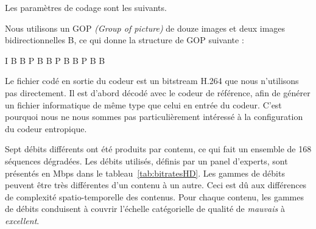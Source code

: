 Les paramètres de codage sont les suivants.

Nous utilisons un GOP \emph{(Group of picture)} de douze images et deux images bidirectionnelles B, ce qui donne la structure de GOP suivante :

\begin{center}
I B B P B B P B B P B B
\end{center}

Le fichier codé en sortie du codeur est un bitstream H.264 que nous n'utilisons pas directement. Il est d'abord décodé avec le codeur de référence, afin de générer un fichier informatique de même type que celui en entrée du codeur. C'est pourquoi nous ne nous sommes pas particulièrement intéressé à la configuration du codeur entropique.

Sept débits différents ont été produits par contenu, ce qui fait un ensemble de 168 séquences dégradées. Les débits utilisés, définis par un panel d'experts, sont présentés en Mbps dans le tableau~\ref{tab:bitratesHD}. Les gammes de débits peuvent être très différentes d'un contenu à un autre. Ceci est dû aux différences de complexité spatio-temporelle des contenus. Pour chaque contenu, les gammes de débits conduisent à couvrir l'échelle catégorielle de qualité de \emph{mauvais} à \emph{excellent}.

